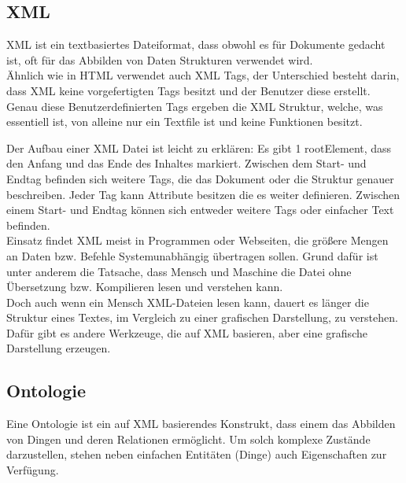 \subsection{XML}
XML ist ein textbasiertes Dateiformat, dass obwohl es für Dokumente gedacht ist, oft für das Abbilden von Daten Strukturen verwendet wird.
\\
Ähnlich wie in HTML verwendet auch XML Tags, der Unterschied besteht darin, dass XML keine vorgefertigten Tags besitzt und der Benutzer diese erstellt. Genau diese Benutzerdefinierten Tags ergeben die XML Struktur, welche, was essentiell ist, von alleine nur ein Textfile ist und keine Funktionen besitzt. 
\newpage

Der Aufbau einer XML Datei ist leicht zu erklären: Es gibt 1 rootElement, dass den Anfang und das Ende des Inhaltes markiert. Zwischen dem Start- und Endtag befinden sich weitere Tags, die das Dokument oder die Struktur genauer beschreiben. Jeder Tag kann Attribute besitzen die es weiter definieren. Zwischen einem Start- und Endtag können sich entweder weitere Tags oder einfacher Text befinden.
\\
Einsatz findet XML meist in Programmen oder Webseiten, die größere Mengen an Daten bzw. Befehle Systemunabhängig übertragen sollen. Grund dafür ist unter anderem die Tatsache, dass Mensch und Maschine die Datei ohne Übersetzung bzw. Kompilieren lesen und verstehen kann.\\
Doch auch wenn ein Mensch XML-Dateien lesen kann, dauert es länger die Struktur eines Textes, im Vergleich zu einer grafischen Darstellung, zu verstehen.\\  
Dafür gibt es andere Werkzeuge, die auf XML basieren, aber eine grafische Darstellung erzeugen.
\subsection{Ontologie}
Eine Ontologie ist ein auf XML basierendes Konstrukt, dass einem das Abbilden von Dingen und deren Relationen ermöglicht. Um solch komplexe Zustände darzustellen, stehen neben einfachen Entitäten (Dinge) auch Eigenschaften zur Verfügung.

